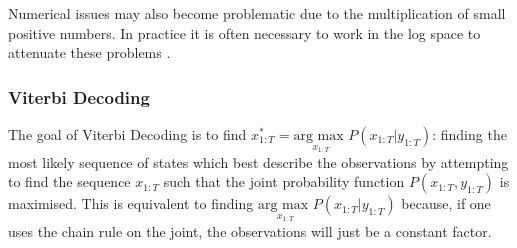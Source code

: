 \documentclass[../masters.tex]{subfiles}
\begin{document}
Numerical issues may also become problematic due to the multiplication of small positive numbers. In practice it is often necessary to work in the log space to attenuate these problems \cite{barber}. 

\subsubsection{Viterbi Decoding}
The goal of Viterbi Decoding is to find $x_{1:T}^* = \underset{x_{1:T}}{\text{arg max }} P(x_{1:T}|y_{1:T})$: finding the most likely sequence of states which best describe the observations by  attempting to find the sequence $x_{1:T}$ such that the joint probability function $P(x_{1:T}, y_{1:T})$ is maximised. This is equivalent to finding $ \underset{x_{1:T}}{\text{arg max }} P(x_{1:T}|y_{1:T})$ because, if one uses the chain rule on the joint, the observations will just be a constant factor. 
\end{document}
